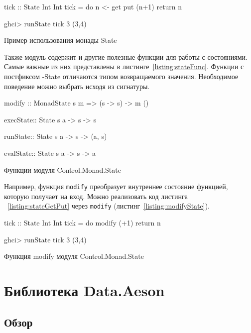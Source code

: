 \begin{ListingEnv}[H]
\begin{Verb}
tick :: State Int Int
tick = do n <- get
	  put (n+1)
          return n

ghci> runState tick 3
(3,4)
\end{Verb}
\caption{Пример использования монады State}
\label{listing:stateGetPut}
\end{ListingEnv}

Также модуль содержит и другие полезные функции для работы с состояниями. Самые важные из них представлены в листинге~\ref{listing:stateFunc}. Функции с постфиксом -State отличаются типом возвращаемого значения. Необходимое поведение можно выбрать исходя из сигнатуры.

\begin{ListingEnv}[H]
\begin{Verb}
modify :: MonadState s m => (s -> s) -> m ()

execState:: State s a -> s -> s

runState:: State s a -> s -> (a, s)

evalState:: State s a -> s -> a
\end{Verb}
\caption{Функции модуля Control.Monad.State}
\label{listing:stateFunc}
\end{ListingEnv}

Например, функция \lstinline{modify} преобразует внутреннее состояние функцией, которую получает на вход. Можно реализовать код листинга ~\ref{listing:stateGetPut} через \lstinline{modify} (листинг~\ref{listing:modifyState}).

\begin{ListingEnv}[H]
\begin{Verb}
tick :: State Int Int
tick = do modify (+1)
          return n

ghci> runState tick 3
(3,4)
\end{Verb}
\caption{Функция modify модуля Control.Monad.State}
\label{listing:modifyState}
\end{ListingEnv}
	
\section{Библиотека Data.Aeson}
\label{sec:secAeson}

\subsection{Обзор}

